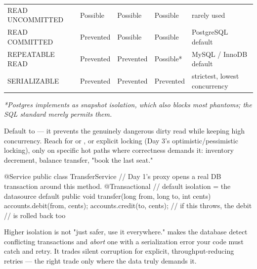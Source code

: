 \begin{center}\footnotesize
\begin{tabularx}{\linewidth}{@{}L{33mm} C{16mm} C{20mm} C{16mm} X@{}}
 &  &  &  & \\\midrule
READ UNCOMMITTED & Possible  & Possible  & Possible   & rarely used\\
READ COMMITTED   & Prevented & Possible  & Possible   & PostgreSQL default\\
REPEATABLE READ  & Prevented & Prevented & Possible*  & MySQL / InnoDB default\\
SERIALIZABLE     & Prevented & Prevented & Prevented  & strictest, lowest concurrency\\
\end{tabularx}\end{center}

{\footnotesize\itshape\color{cInk!70}*Postgres implements  as snapshot isolation, which also blocks most phantoms; the SQL standard merely permits them.}

 Default to  --- it prevents the genuinely dangerous dirty read while keeping high concurrency. Reach for  or , or explicit locking (Day 3's optimistic/pessimistic locking), only on specific hot paths where correctness demands it: inventory decrement, balance transfer, "book the last seat."

\begin{javabox}
@Service
public class TransferService {
  // Day 1's proxy opens a real DB transaction around this method.
  @Transactional  // default isolation = the datasource default
  public void transfer(long from, long to, int cents) {
    accounts.debit(from, cents);
    accounts.credit(to, cents);   // if this throws, the debit
  }                               // is rolled back too
}
\end{javabox}

\begin{misconception}
Higher isolation is not "just safer, use it everywhere."  makes the database detect conflicting transactions and \emph{abort} one with a serialization error your code must catch and retry. It trades silent corruption for explicit, throughput-reducing retries --- the right trade only where the data truly demands it.
\end{misconception}

